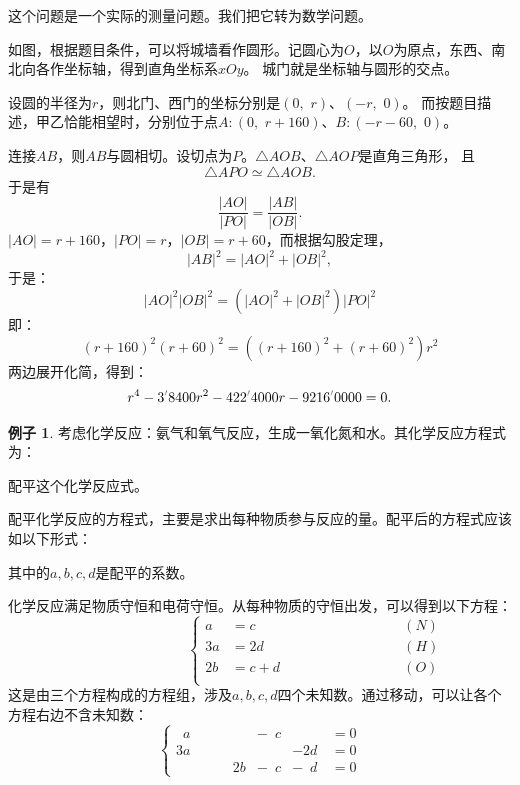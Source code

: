 \documentclass[12pt,UTF8]{ctexbook}
\newcommand{\dlim}[1]{^{\color{gray}\prime}#1}
\theoremstyle{definition}
\newtheorem{ex}{例子}[section]
\theoremstyle{plain}
\begin{document}
这个问题是一个实际的测量问题。我们把它转为数学问题。

如图，根据题目条件，可以将城墙看作圆形。记圆心为$O$，以$O$为原点，东西、南北向各作坐标轴，得到直角坐标系$xOy$。
城门就是坐标轴与圆形的交点。

设圆的半径为$r$，则北门、西门的坐标分别是$(0, \,\, r)$、$(-r, \,\, 0)$。
而按题目描述，甲乙恰能相望时，分别位于点$A:(0, \,\, r+160)$、$B:(-r-60, \,\, 0)$。

连接$AB$，则$AB$与圆相切。设切点为$P$。$\triangle AOB$、$\triangle AOP$是直角三角形，
且
$$ \triangle APO \simeq \triangle AOB.$$
于是有
$$ \frac{|AO|}{|PO|} = \frac{|AB|}{|OB|}.$$
$|AO| = r+160$，$|PO| = r$，$|OB| = r + 60$，而根据勾股定理，
$$ |AB|^2 = |AO|^2 + |OB|^2,$$
于是：
$$ |AO|^2 |OB|^2 = \left(|AO|^2 + |OB|^2\right) |PO|^2 $$
即：
$$ (r+160)^2 (r+60)^2 = \left((r+160)^2 + (r+60)^2\right) r^2 $$
两边展开化简，得到：
$$ r^4 - 3\dlim{8400} r^2 - 422\dlim{4000} r - 9216\dlim{0000} = 0. $$

\begin{ex}
  考虑化学反应：氨气和氧气反应，生成一氧化氮和水。其化学反应方程式为：

\begin{center}
\end{center}

  配平这个化学反应式。
\end{ex}

配平化学反应的方程式，主要是求出每种物质参与反应的量。配平后的方程式应该如以下形式：

\begin{center}
\end{center}

其中的$a, b, c, d$是配平的系数。

化学反应满足物质守恒和电荷守恒。从每种物质的守恒出发，可以得到以下方程：
$$ \qquad \qquad \qquad \qquad \left\{
    \begin{array}{rll}
a &= c &\qquad \qquad \qquad \qquad (N) \\
3a &= 2d &\qquad \qquad \qquad \qquad (H) \\
2b &= c + d &\qquad \qquad \qquad \qquad (O) \\
\end{array}
\right. 
$$
这是由三个方程构成的方程组，涉及$a, b, c, d$四个未知数。通过移动，可以让各个方程右边不含未知数：
$$\left\{
    \begin{array}{rrrrl}
\phantom{0}a &\phantom{+ 0b} &- \phantom{0}c &\phantom{+ 0b}\, &= 0  \\
3a &\phantom{+ 0b} &\phantom{- 0c} &- 2d\, &= 0  \\
\phantom{0a} &\phantom{+ }\quad 2b &- \phantom{0}c &- \phantom{0}d\, &= 0  
\end{array}
\right. 
$$
\end{document}
